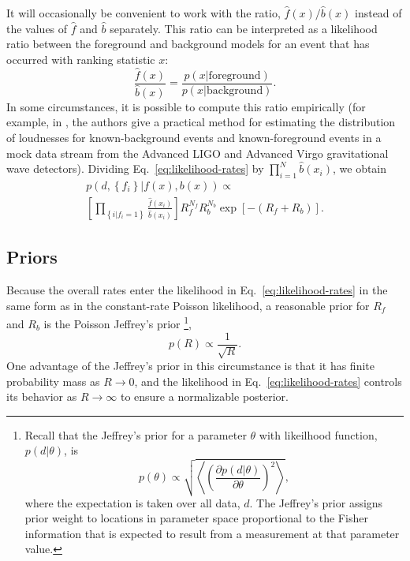 \documentclass[aps,prd,reprint]{revtex4-1}
\begin{document}
It will occasionally be convenient to work with the ratio,
$\hat{f}(x)/\hat{b}(x)$ instead of the values of $\hat{f}$ and
$\hat{b}$ separately.  This ratio can be interpreted as a likelihood
ratio between the foreground and background models for an event that
has occurred with ranking statistic $x$:
\begin{equation}
  \label{eq:loudness-likelihood}
  \frac{\hat{f}(x)}{\hat{b}(x)} = \frac{p(x|\mathrm{foreground})}{p(x|\mathrm{background})}.
\end{equation}
In some circumstances, it is possible to compute this ratio
empirically (for example, in \citet{Cannon2012}, the authors give a
practical method for estimating the distribution of loudnesses for
known-background events and known-foreground events in a mock data
stream from the Advanced LIGO and Advanced Virgo gravitational wave
detectors).  Dividing Eq.~\eqref{eq:likelihood-rates} by
$\prod_{i=1}^N \hat{b}(x_i)$, we obtain
\begin{multline}
  \label{eq:likelihood-ratio}
  p\left(d, \left\{ f_i \right\} | f(x), b(x) \right) \propto  \\ \left[
    \prod_{\left\{ i | f_i = 1 \right\}}
    \frac{\hat{f}(x_i)}{\hat{b}(x_i)} \right] R_f^{N_f} R_b^{N_b}
  \exp\left[ - \left( R_f + R_b \right) \right].
\end{multline}

\subsection{Priors}

Because the overall rates enter the likelihood in
Eq.~\eqref{eq:likelihood-rates} in the same form as in the
constant-rate Poisson likelihood, a reasonable prior for $R_f$ and
$R_b$ is the Poisson Jeffrey's prior%
\footnote{Recall that the Jeffrey's prior for a parameter $\theta$
  with likeilhood function, $p(d|\theta)$, is
  \begin{equation}
    p(\theta) \propto \sqrt{\left\langle \left( \frac{\partial
          p(d | \theta) }{\partial \theta} \right)^2 \right\rangle},
  \end{equation}
  where the expectation is taken over all data, $d$.  The Jeffrey's
  prior assigns prior weight to locations in parameter space
  proportional to the Fisher information that is expected to result
  from a measurement at that parameter value.}, %
\begin{equation}
  \label{eq:Jeffrey-prior}
  p(R) \propto \frac{1}{\sqrt{R}}.
\end{equation}
One advantage of the Jeffrey's prior in this circumstance is that it
has finite probability mass as $R \to 0$, and the likelihood in
Eq.~\eqref{eq:likelihood-rates} controls its behavior as $R\to \infty$
to ensure a normalizable posterior.  
\end{document}
